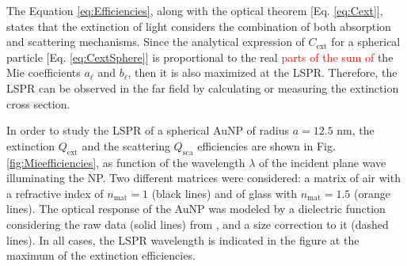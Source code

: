 The Equation \eqref{eq:Efficiencies}, along with the optical theorem [Eq. \eqref{eq:Cext}], states that the extinction of light considers  the combination of both absorption and scattering mechanisms. Since the analytical expression of $C_\text{ext}$ for a spherical particle [Eq. \eqref{eq:CextSphere}] is proportional to the real \textcolor{red}{parts of the sum of} the Mie coefficients $a_\ell$ and $b_\ell$, then it is also maximized at the LSPR. Therefore, the LSPR can be observed in the far field by calculating or measuring the extinction cross section.

In order to study the LSPR of a spherical AuNP of radius $a = 12.5$ nm, the extinction  $Q_\text{ext}$ and the scattering  $Q_\text{sca}$ efficiencies are shown in Fig. \ref{fig:Mieefficiencies}, as function of the wavelength $\lambda$ of the incident plane wave illuminating the NP. Two different matrices were considered: a matrix of air with a refractive index of $n_\text{mat} = 1$ (black lines) and of glass with $n_\text{mat} = 1.5$ (orange lines). The optical response of the AuNP was modeled by a dielectric function considering the raw data (solid lines) from \citeauthor{johnson_optical_1972} \cite{johnson_optical_1972}, and a size correction to it (dashed lines). In all cases, the LSPR wavelength is indicated in the figure at the maximum of the extinction efficiencies.

